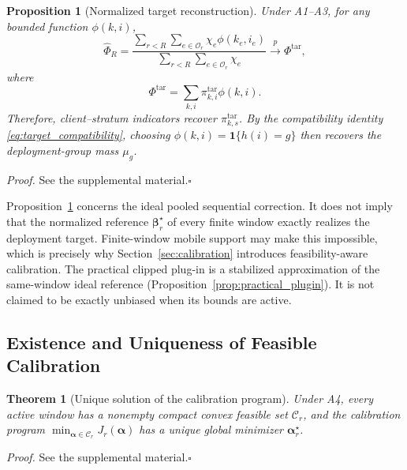 \documentclass[letterpaper,journal]{IEEEtran}
\newtheorem{theorem}{Theorem}
\newtheorem{proposition}{Proposition}
\begin{document}
\begin{proposition}[Normalized target reconstruction]
\label{prop:reconstruction}
Under A1--A3, for any bounded function $\phi(k,i)$,
\begin{equation}
 \widehat\Phi_R
 =
 \frac{
 \sum_{r<R}
 \sum_{e\in\mathcal{O}_r}
 \chi_e\phi(k_e,i_e)
 }{
 \sum_{r<R}
 \sum_{e\in\mathcal{O}_r}
 \chi_e
 }
 \xrightarrow{p}
 \Phi^{\mathrm{tar}},
 \label{eq:hajek_phi}
\end{equation}
where
\begin{equation}
 \Phi^{\mathrm{tar}}
 =
 \sum_{k,i}
 \pi^{\mathrm{tar}}_{k,i}\phi(k,i).
 \label{eq:target_phi}
\end{equation}
Therefore, client--stratum indicators recover
$\pi^{\mathrm{tar}}_{k,s}$.  By the compatibility identity
\eqref{eq:target_compatibility}, choosing
$\phi(k,i)=\mathbf{1}\{h(i)=g\}$ then recovers the deployment-group mass
$\mu_g$.
\end{proposition}

\noindent\emph{Proof.}
See the supplemental material.\hfill$\square$

Proposition~\ref{prop:reconstruction} concerns the ideal pooled sequential
correction.  It does not imply that the normalized reference
$\boldsymbol\beta_r^\star$ of every finite window exactly realizes the
deployment target.  Finite-window mobile support may make this impossible,
which is precisely why Section~\ref{sec:calibration} introduces
feasibility-aware calibration.  The practical clipped plug-in is a
stabilized approximation of the same-window ideal reference
(Proposition~\ref{prop:practical_plugin}).  It is not claimed to be
exactly unbiased when its bounds are active.

\subsection{Existence and Uniqueness of Feasible Calibration}
\label{subsec:theorem_calibration}

\begin{theorem}[Unique solution of the calibration program]
\label{thm:calibration}
Under A4, every active window has a nonempty compact convex feasible set
$\mathcal{C}_r$, and the calibration program
$\min_{\boldsymbol\alpha\in\mathcal{C}_r}J_r(\boldsymbol\alpha)$
has a unique global minimizer $\boldsymbol\alpha_r^\star$.
\end{theorem}

\noindent\emph{Proof.}
See the supplemental material.\hfill$\square$
\end{document}
